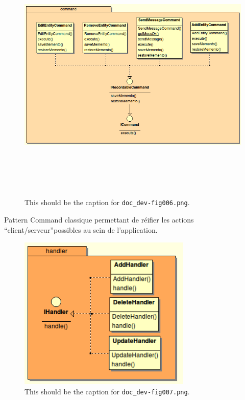 \documentclass{article}
\begin{document}
\begin{figure}[htbp]
\begin{center}
\includegraphics[width=542pt, height=353pt]{doc_dev-fig006.png}
\caption{This should be the caption for \texttt{doc\_dev-fig006.png}.}
\end{center}
\end{figure}

Pattern Command classique permettant de réifier les actions ``client/serveur''possibles 
au sein de l'application.

\begin{figure}[htbp]
\begin{center}
\includegraphics[width=233pt, height=209pt]{doc_dev-fig007.png}
\caption{This should be the caption for \texttt{doc\_dev-fig007.png}.}
\end{center}
\end{figure}
\end{document}
